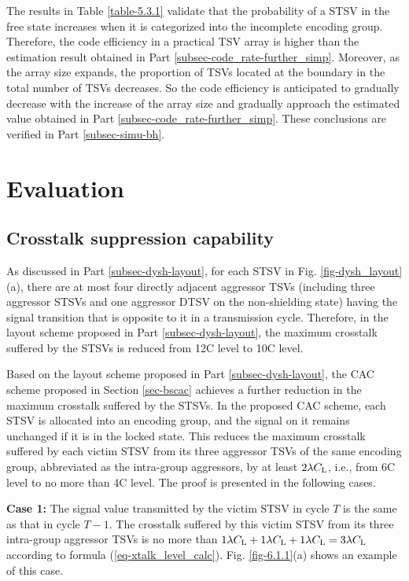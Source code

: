 \documentclass[lettersize,journal]{IEEEtran}
\begin{document}
The results in Table \ref{table-5.3.1} validate that the probability of a STSV in the free state increases when it is categorized into the incomplete encoding group. Therefore, the code efficiency in a practical TSV array is higher than the estimation result obtained in Part \ref{subsec-code_rate-further_simp}. Moreover, as the array size expands, the proportion of TSVs located at the boundary in the total number of TSVs decreases. So the code efficiency is anticipated to gradually decrease with the increase of the array size and gradually approach the estimated value obtained in Part \ref{subsec-code_rate-further_simp}. These conclusions are verified in Part \ref{subsec-simu-bh}.

\section{Evaluation}\label{sec-simu}
\subsection{Crosstalk suppression capability}\label{subsec-simu-xtalk}
As discussed in Part \ref{subsec-dysh-layout}, for each STSV in Fig. \ref{fig-dysh_layout}(a), there are at most four directly adjacent aggressor TSVs (including three aggressor STSVs and one aggressor DTSV on the non-shielding state) having the signal transition that is opposite to it in a transmission cycle. Therefore, in the layout scheme proposed in Part \ref{subsec-dysh-layout}, the maximum crosstalk suffered by the STSVs is reduced from 12C level to 10C level.

Based on the layout scheme proposed in Part \ref{subsec-dysh-layout}, the CAC scheme proposed in Section \ref{sec-bscac} achieves a further reduction in the maximum crosstalk suffered by the STSVs. In the proposed CAC scheme, each STSV is allocated into an encoding group, and the signal on it remains unchanged if it is in the locked state. This reduces the maximum crosstalk suffered by each victim STSV from its three aggressor TSVs of the same encoding group, abbreviated as the intra-group aggressors, by at least $2\lambda C_{\rm L}$, i.e., from 6C level to no more than 4C level. The proof is presented in the following cases.

{\bf Case 1:} The signal value transmitted by the victim STSV in cycle $T$ is the same as that in cycle $T-1$. The crosstalk suffered by this victim STSV from its three intra-group aggressor TSVs is no more than $1\lambda C_{\rm L}+1\lambda C_{\rm L}+1\lambda C_{\rm L}=3\lambda C_{\rm L}$ according to formula (\ref{eq-xtalk_level_calc}). Fig. \ref{fig-6.1.1}(a) shows an example of this case.
\end{document}
